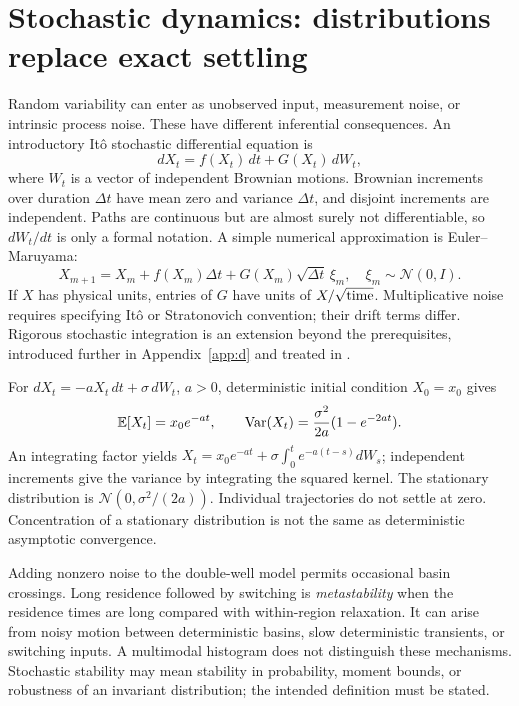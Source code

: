 \section{Stochastic dynamics: distributions replace exact settling}
Random variability can enter as unobserved input, measurement noise, or intrinsic process noise. These have different inferential consequences. An introductory It\^o stochastic differential equation is
\begin{equation}\label{eq:sde}
 dX_t=f(X_t)\,dt+G(X_t)\,dW_t,
\end{equation}
where $W_t$ is a vector of independent Brownian motions. Brownian increments over duration $\Delta t$ have mean zero and variance $\Delta t$, and disjoint increments are independent. Paths are continuous but are almost surely not differentiable, so $dW_t/dt$ is only a formal notation. A simple numerical approximation is Euler--Maruyama:
\begin{equation}
X_{m+1}=X_m+f(X_m)\Delta t+G(X_m)\sqrt{\Delta t}\,\xi_m,
\quad \xi_m\sim\mathcal N(0,I).
\end{equation}
If $X$ has physical units, entries of $G$ have units of $X/\sqrt{\rm time}$. Multiplicative noise requires specifying It\^o or Stratonovich convention; their drift terms differ. Rigorous stochastic integration is an extension beyond the prerequisites, introduced further in Appendix~\ref{app:d} and treated in \citet{oksendal2003}.

\begin{example}
For $dX_t=-aX_t\,dt+\sigma\,dW_t$, $a>0$, deterministic initial condition $X_0=x_0$ gives
\begin{equation}
\mathbb{E}[X_t]=x_0e^{-at},\qquad
\operatorname{Var}(X_t)=\frac{\sigma^2}{2a}(1-e^{-2at}).
\end{equation}
An integrating factor yields $X_t=x_0e^{-at}+\sigma\int_0^t e^{-a(t-s)}dW_s$; independent increments give the variance by integrating the squared kernel. The stationary distribution is $\mathcal N(0,\sigma^2/(2a))$. Individual trajectories do not settle at zero. Concentration of a stationary distribution is not the same as deterministic asymptotic convergence.
\end{example}

Adding nonzero noise to the double-well model permits occasional basin crossings. Long residence followed by switching is \emph{metastability} when the residence times are long compared with within-region relaxation. It can arise from noisy motion between deterministic basins, slow deterministic transients, or switching inputs. A multimodal histogram does not distinguish these mechanisms. Stochastic stability may mean stability in probability, moment bounds, or robustness of an invariant distribution; the intended definition must be stated.

